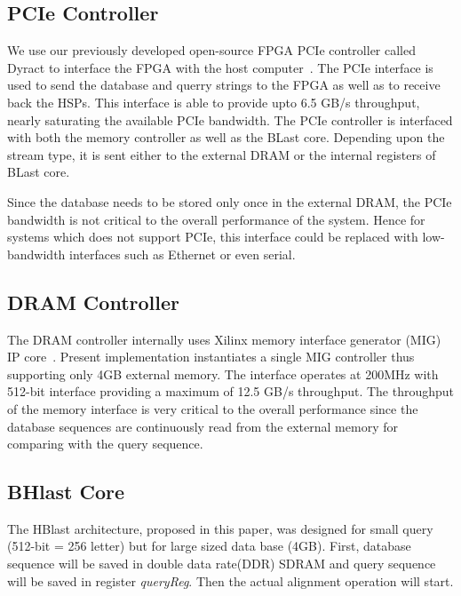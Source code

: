 \subsection{PCIe Controller}
We use our previously developed open-source FPGA PCIe controller called Dyract to interface the FPGA with the host computer~\cite{Vipin2014}.
The PCIe interface is used to send the database and querry strings to the FPGA as well as to receive back the HSPs.
This interface is able to provide upto 6.5 GB/s throughput, nearly saturating the available PCIe bandwidth.
The PCIe controller is interfaced with both the memory controller as well as the BLast core.
Depending upon the stream type, it is sent either to the external DRAM or the internal registers of BLast core.

Since the database needs to be stored only once in the external DRAM, the PCIe bandwidth is not critical to the overall performance of the system. Hence for systems which does not support PCIe, this interface could be replaced with low-bandwidth interfaces such as Ethernet or even serial.

\subsection{DRAM Controller}
The DRAM controller internally uses Xilinx memory interface generator (MIG) IP core~\cite{mig2018}. 
Present implementation instantiates a single MIG controller thus supporting only 4GB external memory.
The interface operates at 200MHz with 512-bit interface providing a maximum of 12.5 GB/s throughput.
The throughput of the memory interface is very critical to the overall performance since the database sequences are continuously read from the external memory for comparing with the query sequence.

\subsection{BHlast Core}

\quad The HBlast architecture, proposed in this paper, was designed for small query (512-bit = 256 letter) but for large sized data base (4GB).  First, database sequence will be saved in double data rate(DDR) SDRAM and query sequence will be saved in register \textit{queryReg}. Then the actual alignment operation will start. 
   

